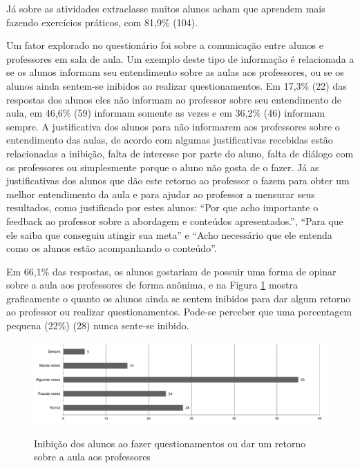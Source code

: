 Já sobre as atividades extraclasse muitos alunos acham que aprendem mais fazendo exercícios práticos, com 81,9\% (104).

Um fator explorado no questionário foi sobre a comunicação entre alunos e professores em sala de aula. Um exemplo deste tipo de informação é relacionada a se os alunos informam seu entendimento sobre as aulas aos professores, ou se os alunos ainda sentem-se inibidos ao realizar questionamentos. Em 17,3\% (22) das respostas dos alunos eles não informam ao professor sobre seu entendimento de aula, em 46,6\% (59) informam somente as vezes e em 36,2\% (46) informam sempre. A justificativa dos alunos para não informarem aos professores sobre o entendimento das aulas, de acordo com algumas justificativas recebidas estão relacionadas a inibição, falta de interesse por parte do aluno, falta de diálogo com os professores ou simplesmente porque o aluno não gosta de o fazer. Já as justificativas dos alunos que dão este retorno ao professor o fazem para obter um melhor entendimento da aula e para ajudar ao professor a mensurar seus resultados, como justificado por estes alunos: ``Por que acho importante o feedback ao professor sobre a abordagem e conteúdos apresentados.'', ``Para que ele saiba que conseguiu atingir sua meta'' e ``Acho necessário que ele entenda como os alunos estão acompanhando o conteúdo''.

Em 66,1\% das respostas, os alunos gostariam de possuir uma forma de opinar sobre a aula aos professores de forma anônima, e na Figura \ref{fig:grafico_inibido} mostra graficamente o quanto os alunos ainda se sentem inibidos para dar algum retorno ao professor ou realizar questionamentos. Pode-se perceber que uma porcentagem pequena (22\%) (28) nunca sente-se inibido.

\begin{figure}
\centering
\caption{Inibição dos alunos ao fazer questionamentos ou dar um retorno sobre a aula aos professores}
\includegraphics[width=1.0\textwidth]{pdfs/alunos-professores/pesquisa-inibicao-alunos.pdf} 
\label{fig:grafico_inibido} 
\end{figure}

